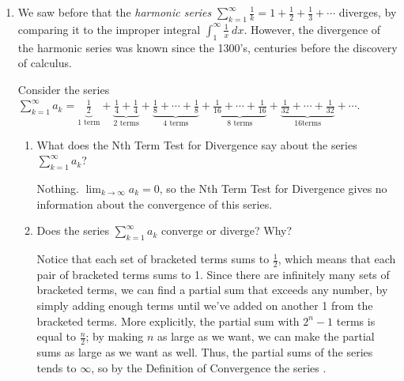 \documentclass[main]{subfiles}
\begin{document}
 \begin{enumerate}

  
   \item
We saw before that the \textit{harmonic series} $\displaystyle \sum_{k=1}^{\infty} \frac1k = 1+\frac12 +\frac13 +\cdots$ diverges, by comparing it to the improper integral $\displaystyle \int_1^{\infty} \frac1x~dx$. However, the divergence of the harmonic series was known since the 1300's, centuries before the discovery of calculus.

Consider the series $\displaystyle \sum_{k=1}^{\infty} a_k = \underbrace{\frac{1}{2}}_{\textrm{1 term}} + \underbrace{\frac{1}{4} +
      \frac{1}{4}}_{\textrm{2 terms}} + \underbrace{\frac{1}{8} + \cdots +
      \frac{1}{8}}_{\textrm{$4$ terms}} + \underbrace{\frac{1}{16} +
      \cdots + \frac{1}{16}}_{\textrm{$8$ terms}} +
      \underbrace{\frac{1}{32} + \cdots + \frac{1}{32}}_{\textrm{$16$
      terms}} + \cdots$.

    \begin{enumerate}
      \item What does the Nth Term Test for Divergence say about the series $\displaystyle \sum_{k=1}^{\infty} a_k$?
      \begin{problem}[0.5in]
      
      \end{problem}

      \begin{solution}
      Nothing.  $\displaystyle \lim_{k \to \infty} a_k = 0$, so
      the Nth Term Test for Divergence gives no information about the convergence of this series.
      \end{solution}

      \item    
      \begin{problem}[1in]
      Does the series $\displaystyle \sum_{k=1}^{\infty} a_k$ converge or diverge? Why?
      \end{problem}
      
      
      \begin{solution}
      Notice that each set of bracketed terms sums to $\frac12$, which means that each pair of bracketed terms sums to 1. Since there are infinitely many sets of bracketed terms, we can find a partial sum that exceeds any number, by simply adding enough terms until we've added on another 1 from the bracketed terms. More explicitly, the partial sum with $2^n-1$ terms is equal to  $\frac{n}{2}$; by making $n$ as large as we want, we can make the partial sums as large as we want as well.  Thus, the partial sums of the series tends to $\infty$, so by the Definition of Convergence the series .   
      \end{solution}
      

\end{enumerate}
\end{enumerate}
\end{document}
